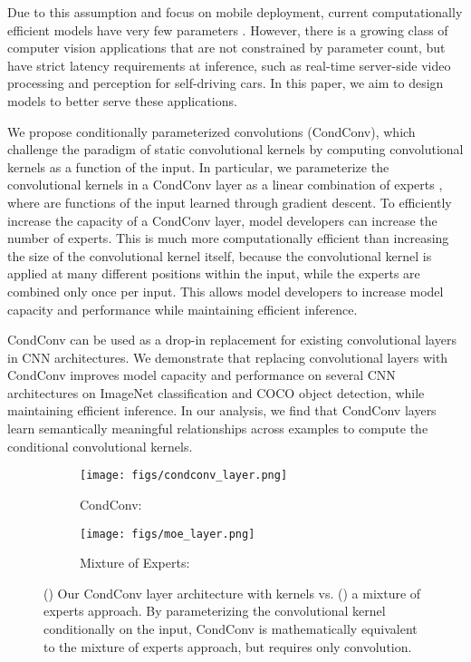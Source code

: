 \documentclass{article}
\def\codename{CondConv}
\begin{document}
Due to this assumption and focus on mobile deployment, current computationally efficient models have very few parameters \cite{howard2017mobilenets, sandler2018mobilenetv2, tan2018mnasnet}. However, there is a growing class of computer vision applications that are not constrained by parameter count, but have strict latency requirements at inference, such as real-time server-side video processing and perception for self-driving cars. In this paper, we aim to design models to better serve these applications.

We propose conditionally parameterized convolutions (\codename{}), which challenge the paradigm of static convolutional kernels by computing convolutional kernels as a function of the input. In particular, we parameterize the convolutional kernels in a \codename{} layer as a linear combination of  experts , where  are functions of the input learned through gradient descent. To efficiently increase the capacity of a \codename{} layer, model developers can increase the number of experts. This is much more computationally efficient than increasing the size of the convolutional kernel itself, because the convolutional kernel is applied at many different positions within the input, while the experts are combined only once per input. This allows model developers to increase model capacity and performance while maintaining efficient inference.

\codename{} can be used as a drop-in replacement for existing convolutional layers in CNN architectures. We demonstrate that replacing convolutional layers with \codename{} improves model capacity and performance on several CNN architectures on ImageNet classification and COCO object detection, while maintaining efficient inference. In our analysis, we find that \codename{} layers learn semantically meaningful relationships across examples to compute the conditional convolutional kernels.

\begin{figure}[t]
  \centering
  \begin{subfigure}[b]{0.50\textwidth}
    \centering\texttt{[image: figs/condconv\_layer.png]}
    \caption{\label{fig:condconv_layer} \codename{}: }
  \end{subfigure}\begin{subfigure}[b]{0.50\textwidth}
    \centering\texttt{[image: figs/moe\_layer.png]}
    \caption{\label{fig:moe_layer} Mixture of Experts: }
  \end{subfigure}
  \caption{() Our \codename{} layer architecture with  kernels vs. () a mixture of experts approach. By parameterizing the convolutional kernel conditionally on the input, \codename{} is mathematically equivalent to the mixture of experts approach, but requires only  convolution.}
  \label{fig:condconv_figure}
\end{figure}
\end{document}
